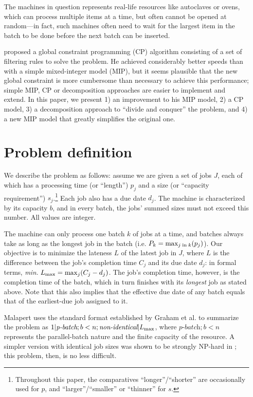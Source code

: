\documentclass[13pt, letterpaper, oneside]{book}
\begin{document}
The machines in question represents real-life resources like autoclaves or
ovens, which can process multiple items at a time, but often cannot be opened at
random---in fact, such machines often need to wait for the largest item in the
batch to be done before the next batch can be inserted.

\citet{Malapert} proposed a global constraint programming (CP) algorithm consisting
of a set of filtering rules to solve the problem. He achieved considerably
better speeds than with a simple mixed-integer model (MIP), but it seems plausible
that the new global constraint is more cumbersome than necessary to achieve this
performance; simple MIP, CP or decomposition approaches are easier to implement
and extend.  In this paper, we present 1) an improvement to his MIP model, 2) a
CP model, 3) a decomposition approach to ``divide and conquer'' the problem, and
4) a new MIP model that greatly simplifies the original one.

\section{Problem definition}
We describe the problem as follows: assume we are given a set of jobs $J$, each of
which has a processing time (or ``length'') $p_j$ and a size (or ``capacity
requirement'') $s_j$.\footnote{Throughout this paper, the comparatives
``longer''/``shorter'' are occasionally used for $p$, and ``larger''/``smaller''
or ``thinner'' for $s$.} Each job also has a due date $d_j$. The machine is characterized by
its capacity $b$, and in every batch, the jobs' summed sizes must not exceed
this number. All values are integer.

The machine can only process one batch $k$ of jobs at a time, and batches always
take as long as the longest job in the batch (i.e. $P_k = \max_{j \text{\;in\;} k}(p_j)$).
Our objective is to minimize the lateness $L$ of the latest job in $J$, where
$L$ is the difference between the job's completion time $C_j$ and its due date
$d_j$: in formal terms, \textit{min.} $L_{\text{max}} = \max_j(C_j - d_j)$. The job's
completion time, however, is the completion time of the batch, which in turn
finishes with its \textit{longest} job as stated above. Note that this also
implies that the effective due date of any batch equals that of the earliest-due
job assigned to it.

Malapert uses the standard format established by Graham et al. to
summarize the problem as $1|\textit{p-batch}; b < n;
\textit{non-identical}|L_{\text{max}}$, where $\textit{p-batch};b<n$ represents the
parallel-batch nature and the finite capacity of the resource. A simpler version
with identical job sizes was shown to be strongly NP-hard in \citep{Brucker};
this problem, then, is no less difficult.
\end{document}
